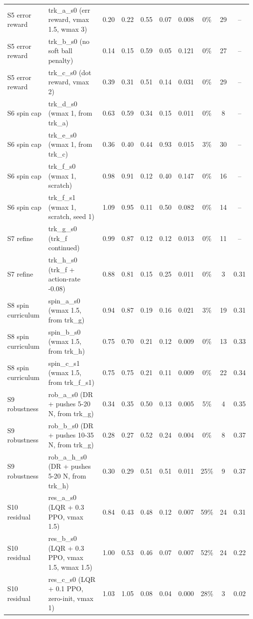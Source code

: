 \begin{table}[t]
{\begin{tabular}{llcccccccc}
S5 error reward & trk\_a\_s0 (err reward, vmax 1.5, wmax 3) & 0.20 & 0.22 & 0.55 & 0.07 & 0.008 & 0\% &29 & --\\
S5 error reward & trk\_b\_s0 (no soft ball penalty) & 0.14 & 0.15 & 0.59 & 0.05 & 0.121 & 0\% &27 & --\\
S5 error reward & trk\_c\_s0 (dot reward, vmax 2) & 0.39 & 0.31 & 0.51 & 0.14 & 0.031 & 0\% &29 & --\\
S6 spin cap & trk\_d\_s0 (wmax 1, from trk\_a) & 0.63 & 0.59 & 0.34 & 0.15 & 0.011 & 0\% &8 & --\\
S6 spin cap & trk\_e\_s0 (wmax 1, from trk\_c) & 0.36 & 0.40 & 0.44 & 0.93 & 0.015 & 3\% &30 & --\\
S6 spin cap & trk\_f\_s0 (wmax 1, scratch) & 0.98 & 0.91 & 0.12 & 0.40 & 0.147 & 0\% &16 & --\\
S6 spin cap & trk\_f\_s1 (wmax 1, scratch, seed 1) & 1.09 & 0.95 & 0.11 & 0.50 & 0.082 & 0\% &14 & --\\
S7 refine & trk\_g\_s0 (trk\_f continued) & 0.99 & 0.87 & 0.12 & 0.12 & 0.013 & 0\% &11 & --\\
S7 refine & trk\_h\_s0 (trk\_f + action-rate -0.08) & 0.88 & 0.81 & 0.15 & 0.25 & 0.011 & 0\% &3 & 0.31\\
S8 spin curriculum & spin\_a\_s0 (wmax 1.5, from trk\_g) & 0.94 & 0.87 & 0.19 & 0.16 & 0.021 & 3\% &19 & 0.31\\
S8 spin curriculum & spin\_b\_s0 (wmax 1.5, from trk\_h) & 0.75 & 0.70 & 0.21 & 0.12 & 0.009 & 0\% &13 & 0.33\\
S8 spin curriculum & spin\_c\_s1 (wmax 1.5, from trk\_f\_s1) & 0.75 & 0.75 & 0.21 & 0.11 & 0.009 & 0\% &22 & 0.34\\
S9 robustness & rob\_a\_s0 (DR + pushes 5-20 N, from trk\_g) & 0.34 & 0.35 & 0.50 & 0.13 & 0.005 & 5\% &4 & 0.35\\
S9 robustness & rob\_b\_s0 (DR + pushes 10-35 N, from trk\_g) & 0.28 & 0.27 & 0.52 & 0.24 & 0.004 & 0\% &8 & 0.37\\
S9 robustness & rob\_a\_h\_s0 (DR + pushes 5-20 N, from trk\_h) & 0.30 & 0.29 & 0.51 & 0.51 & 0.011 & 25\% &9 & 0.37\\
S10 residual & res\_a\_s0 (LQR + 0.3 PPO, vmax 1.5) & 0.84 & 0.43 & 0.48 & 0.12 & 0.007 & 59\% &24 & 0.31\\
S10 residual & res\_b\_s0 (LQR + 0.3 PPO, vmax 1.5, wmax 1.5) & 1.00 & 0.53 & 0.46 & 0.07 & 0.007 & 52\% &24 & 0.22\\
S10 residual & res\_c\_s0 (LQR + 0.1 PPO, zero-init, vmax 1) & 1.03 & 1.05 & 0.08 & 0.04 & 0.000 & 28\% &3 & 0.02\\

\end{tabular}}
\end{table}
